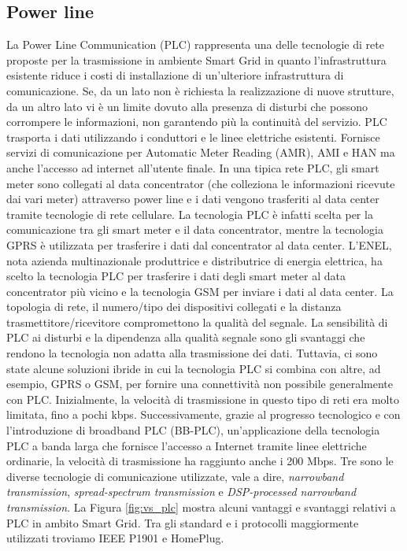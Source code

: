 \subsection{Power line}
La Power Line Communication (PLC) rappresenta una delle tecnologie di rete proposte per la trasmissione in ambiente Smart Grid in quanto l'infrastruttura esistente riduce i costi di installazione di un'ulteriore infrastruttura di comunicazione. Se, da un lato non è richiesta la realizzazione di nuove strutture, da un altro lato vi è un limite dovuto alla presenza di disturbi che possono corrompere le informazioni, non garantendo più la continuità del servizio. PLC trasporta i dati utilizzando i conduttori e le linee elettriche esistenti. Fornisce servizi di comunicazione per Automatic Meter Reading (AMR), AMI e HAN ma anche l'accesso ad internet all'utente finale. In una tipica rete PLC, gli smart meter sono collegati al data concentrator (che colleziona le informazioni ricevute dai vari meter) attraverso power line e i dati vengono trasferiti al data center tramite tecnologie di rete cellulare. La tecnologia PLC è infatti scelta per la comunicazione tra gli smart meter e il data concentrator, mentre la tecnologia GPRS è utilizzata per trasferire i dati dal concentrator al data center.\newline\newline
L'ENEL, nota azienda multinazionale produttrice e distributrice di energia elettrica, ha scelto la tecnologia PLC per trasferire i dati degli smart meter al data concentrator più vicino e la tecnologia GSM per inviare i dati al data center.
La topologia di rete, il numero/tipo dei dispositivi collegati e la distanza trasmettitore/ricevitore compromettono la qualità del segnale.
\newpage
La sensibilità di PLC ai disturbi e la dipendenza alla qualità segnale sono gli svantaggi che rendono la tecnologia non adatta alla trasmissione dei dati. Tuttavia, ci sono state alcune soluzioni ibride in cui la tecnologia PLC si combina con altre, ad esempio, GPRS o GSM, per fornire una connettività non possibile generalmente con PLC.\newline\newline
Inizialmente, la velocità di trasmissione in questo tipo di reti era molto limitata, fino a pochi kbps. Successivamente, grazie al progresso tecnologico e con l'introduzione di broadband PLC (BB-PLC), un'applicazione della tecnologia PLC a banda larga che fornisce l'accesso a Internet tramite linee elettriche ordinarie, la velocità di trasmissione ha raggiunto anche i 200 Mbps. Tre sono le diverse tecnologie di comunicazione utilizzate, vale a dire, \emph{narrowband transmission}, \emph{spread-spectrum transmission} e \emph{DSP-processed narrowband transmission}. La Figura \ref{fig:vs_plc} mostra alcuni vantaggi e svantaggi relativi a PLC in ambito Smart Grid. Tra gli standard e i protocolli maggiormente utilizzati troviamo IEEE P1901 e HomePlug.\vspace{20pt}
